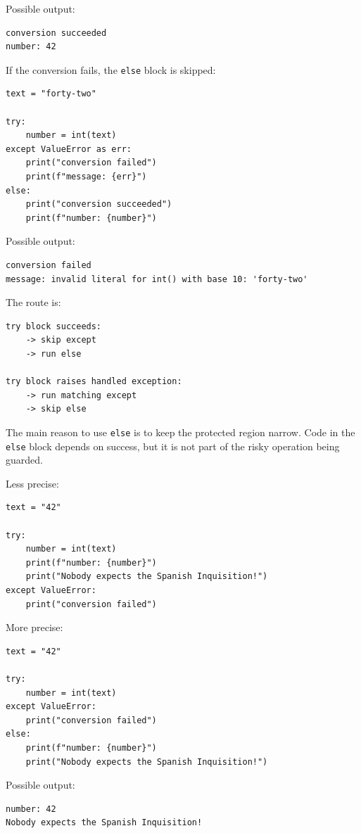 Possible output:

\begin{verbatim}
conversion succeeded
number: 42
\end{verbatim}

If the conversion fails, the \texttt{else} block is skipped:

\begin{verbatim}
text = "forty-two"

try:
    number = int(text)
except ValueError as err:
    print("conversion failed")
    print(f"message: {err}")
else:
    print("conversion succeeded")
    print(f"number: {number}")
\end{verbatim}

Possible output:

\begin{verbatim}
conversion failed
message: invalid literal for int() with base 10: 'forty-two'
\end{verbatim}

The route is:

\begin{verbatim}
try block succeeds:
    -> skip except
    -> run else

try block raises handled exception:
    -> run matching except
    -> skip else
\end{verbatim}

The main reason to use \texttt{else} is to keep the protected region narrow. Code in the \texttt{else} block depends on success, but it is not part of the risky operation being guarded.

Less precise:

\begin{verbatim}
text = "42"

try:
    number = int(text)
    print(f"number: {number}")
    print("Nobody expects the Spanish Inquisition!")
except ValueError:
    print("conversion failed")
\end{verbatim}

More precise:

\begin{verbatim}
text = "42"

try:
    number = int(text)
except ValueError:
    print("conversion failed")
else:
    print(f"number: {number}")
    print("Nobody expects the Spanish Inquisition!")
\end{verbatim}

Possible output:

\begin{verbatim}
number: 42
Nobody expects the Spanish Inquisition!
\end{verbatim}

